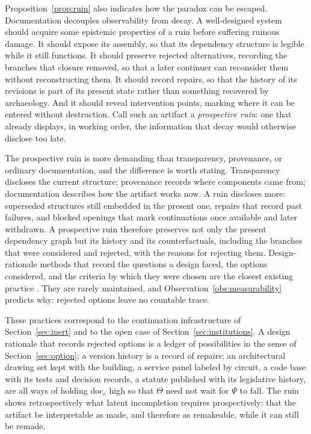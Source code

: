 Proposition~\ref{prop:ruin} also indicates how the paradox can be escaped. Documentation decouples observability from decay. A well-designed system should acquire some epistemic properties of a ruin before suffering ruinous damage. It should expose its assembly, so that its dependency structure is legible while it still functions. It should preserve rejected alternatives, recording the branches that closure removed, so that a later continuer can reconsider them without reconstructing them. It should record repairs, so that the history of its revisions is part of its present state rather than something recovered by archaeology. And it should reveal intervention points, marking where it can be entered without destruction. Call such an artifact a \emph{prospective ruin}: one that already displays, in working order, the information that decay would otherwise disclose too late.

The prospective ruin is more demanding than transparency, provenance, or ordinary documentation, and the difference is worth stating. Transparency discloses the current structure; provenance records where components came from; documentation describes how the artifact works now. A ruin discloses more: superseded structures still embedded in the present one, repairs that record past failures, and blocked openings that mark continuations once available and later withdrawn. A prospective ruin therefore preserves not only the present dependency graph but its history and its counterfactuals, including the branches that were considered and rejected, with the reasons for rejecting them. Design-rationale methods that record the questions a design faced, the options considered, and the criteria by which they were chosen are the closest existing practice \cite{maclean1991}. They are rarely maintained, and Observation~\ref{obs:measurability} predicts why: rejected options leave no countable trace.

These practices correspond to the continuation infrastructure of Section~\ref{sec:inert} and to the open case of Section~\ref{sec:institutions}. A design rationale that records rejected options is a ledger of possibilities in the sense of Section~\ref{sec:option}; a version history is a record of repairs; an architectural drawing set kept with the building, a service panel labeled by circuit, a code base with its tests and decision records, a statute published with its legislative history, are all ways of holding $\mathrm{doc}_e$ high so that $\Theta$ need not wait for $\Psi$ to fall. The ruin shows retrospectively what latent incompletion requires prospectively: that the artifact be interpretable as made, and therefore as remakeable, while it can still be remade.

